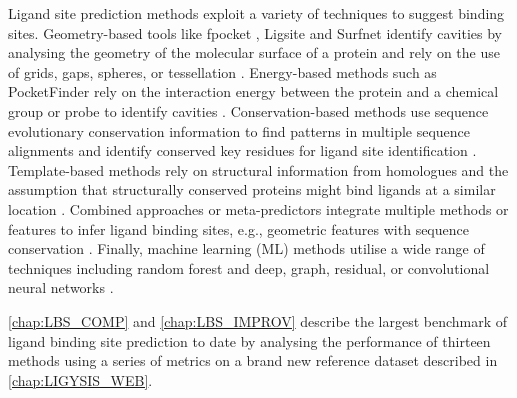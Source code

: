 Ligand site prediction methods exploit a variety of techniques to suggest binding sites. Geometry-based tools like fpocket \cite{GUILLOUX_2009_FPOCKET}, Ligsite \cite{HENDLICH_1997_LIGSITE} and Surfnet \cite{LASKOWSKI_1995_SURFNET} identify cavities by analysing the geometry of the molecular surface of a protein and rely on the use of grids, gaps, spheres, or tessellation \cite{GUILLOUX_2009_FPOCKET, SCHMIDTKE_2010_FPOCKET2, WEISEL_2007_POCKETPICKER, BRADY_2000_PASS, LIANG_1998_CAVITIES, HENDLICH_1997_LIGSITE, LASKOWSKI_1995_SURFNET, KLEYWEGT_1994_CAVITIES, LEVITT_1992_POCKET}. Energy-based methods such as PocketFinder \cite{AN_2005_POCKETFINDER} rely on the interaction energy between the protein and a chemical group or probe to identify cavities \cite{AN_2005_POCKETFINDER, NGAN_2012_FTSITE, GHERSI_2009_SITEHOUND, LAURIE_2005_QSITEFINDER, AN_2004_PREDICTOR, GOODFORD_1982_PREDICTOR}. Conservation-based methods use sequence evolutionary conservation information to find patterns in multiple sequence alignments and identify conserved key residues for ligand site identification \cite{XIE_2012_CONSPRED, PUPKO_2002_RATE4SITE, ARMON_2001_SCORE}. Template-based methods rely on structural information from homologues and the assumption that structurally conserved proteins might bind ligands at a similar location \cite{ZVELEBIL_1987_PREDICTION, WASS_2010_3DLIGANDSITE, YANG_2013_COFACTOR, LEE_2013_PREDICTION, BRYLINSKI_2013_EFINDSITE, ROY_2012_COFACTOR}. Combined approaches or meta-predictors integrate multiple methods or features to infer ligand binding sites, e.g., geometric features with sequence conservation \cite{GUTTERIDGE_2003_LBSP, HUANG_2006_BU48, GLASER_2006_PREDICTION, HALGREN_2009_PREDICITON, CAPRA_2009_CONCAVITY, HUANG_2009_METAPOCKET, BRAY_2009_SITESIDENTIFY, BRYLINSKI_2009_FINDSITE}. Finally, machine learning (ML) methods utilise a wide range of techniques including random forest and deep, graph, residual, or convolutional neural networks \cite{KRIVAK_2015_PRANK, KRIVAK_2015_P2RANK, JIMENEZ_2017_DEEPSITE, KRIVAK_2018_P2RANK, JENDELE_2019_PRANKWEB, SANTANA_2020_GRaSP, KOZLOVSKII_2020_BITENET, STEPNIEWSKA_2020_KALASANTY, KANDEL_2021_PURESNET, MYOLNAS_2021_DEEPSURF, YAN_2022_POINTSITE, LI_2022_RECURPOCKET, AGGARWAL_2022_DEEPPOCKET, JAKUBEC_2022_PRANKWEB, ABDOLLAHI_2023_NODECODER, EVTEEV_2023_SITERADAR, LI_2023_GLPOCKET, ZHANG_2024_EQUIPOCKET, LIU_2023_REFINEPOCKET, SMITH_2024_GrASP, CARBERY_2024_IFSP, SESTAK_2024_VNEGNN, KANDEL_2024_PURESNET}.

\autoref{chap:LBS_COMP} and \autoref{chap:LBS_IMPROV} describe the largest benchmark of ligand binding site prediction to date by analysing the performance of thirteen methods using a series of metrics on a brand new reference dataset described in \autoref{chap:LIGYSIS_WEB}.

